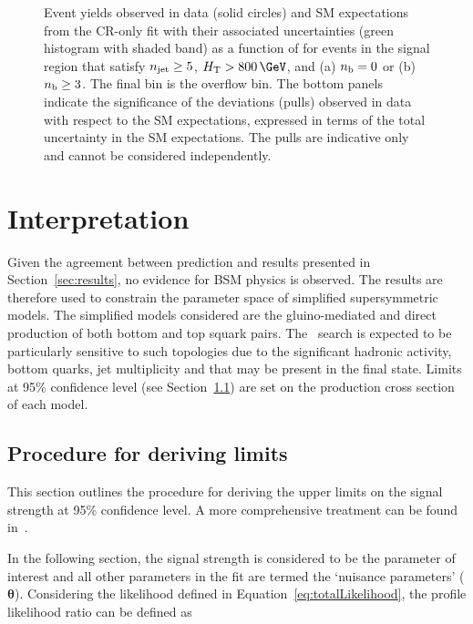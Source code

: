 \begin{figure}[!tbhp]
\begin{center}
  \end{center}
  \caption{Event yields observed in data (solid circles) and SM
    expectations from the CR-only fit with their associated
    uncertainties (green histogram with shaded band) as a function of
    \mht for events in the signal region that satisfy $n_{\text{jet}} \geq
    5$, $\scalht > 800\,\GeV$, and (a) $n_{\mathrm{b}} = 0$ or (b) $n_{\mathrm{b}} \geq
    3$. The final bin is the overflow bin. The bottom panels indicate
    the significance of the deviations (pulls) observed in data with respect
    to the SM expectations, expressed in terms of the total
    uncertainty in the SM expectations. The pulls are indicative only
    and cannot be considered independently.  
    \label{fig:mht-templates} 
  }
\end{figure}

\clearpage
\section{Interpretation}

Given the agreement between prediction and results presented in Section~\ref{sec:results}, no evidence
for BSM physics is observed. The results are therefore used to constrain
the parameter space of simplified supersymmetric models. The simplified 
models considered are the gluino-mediated and direct production of
both bottom and top squark pairs. The \alphat~search is expected to be particularly
sensitive to such topologies due to the significant hadronic activity, bottom quarks, jet multiplicity
and \mht that may be present in the final state. Limits at 95\% confidence level (see Section~\ref{sec:limits}) 
are set on the production cross section of each model.

\subsection{Procedure for deriving limits}
\label{sec:limits}

This section outlines the procedure for deriving the upper limits on the signal 
strength at 95\% confidence level. A more comprehensive treatment can be found in~\cite{asymp}.

In the following section, the signal strength is considered to be the parameter of interest
and all other parameters in the fit are termed the `nuisance parameters' ($\boldsymbol{\theta}$). Considering
the likelihood defined in Equation~\ref{eq:totalLikelihood}, the profile likelihood ratio can be defined as


